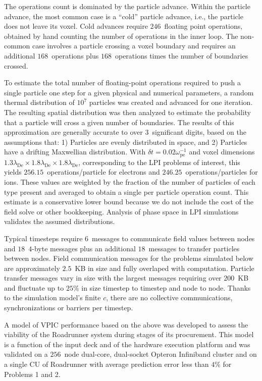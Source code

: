\documentclass[journal,twoside]{IEEEtran}
\newcommand{\lde}      {\lambda_{\mathrm{De}}}
\newcommand{\wpe}      {\omega_{\mathrm{pe}}}
\begin{document}
The operations count is dominated by the particle advance.  Within the
particle advance, the most common case is a ``cold'' particle advance,
i.e., the particle does not leave its voxel.  Cold advances require
$246$~floating point operations, obtained by hand counting the number
of operations in the inner loop.  The non-common case involves a
particle crossing a voxel boundary and requires an additional
$168$~operations plus $168$~operations times the number of boundaries
crossed.

To estimate the total number of floating-point operations required to
push a single particle one step for a given physical and numerical
parameters, a random thermal distribution of $10^7$ particles was
created and advanced for one iteration.  The resulting spatial
distribution was then analyzed to estimate the probability that a
particle will cross a given number of boundaries.  The results of this
approximation are generally accurate to over $3$~significant digits,
based on the assumptions that: 1) Particles are evenly distributed in
space, and 2) Particles have a drifting Maxwellian distribution.  With
$\delta t = 0.02 \wpe^{-1}$ and voxel dimensions $1.3\lde \times
1.8\lde \times 1.8\lde$, corresponding to the LPI problems of
interest, this yields $256.15$~operations/particle for electrons and
$246.25$~operations/particles for ions.  These values are weighted by
the fraction of the number of particles of each type present and
averaged to obtain a single per particle operation count.  This
estimate is a conservative lower bound because we do not include the
cost of the field solve or other bookkeeping.  Analysis of phase space
in LPI simulations validates the assumed
distributions.~\cite{Yin_et_al_Phys_Plasmas_2007_SRS}

Typical timesteps require $6$~messages to communicate field values
between nodes and $18$~$4$-byte messages plus an additional
$18$~messages to transfer particles between nodes.  Field
communication messages for the problems simulated below are
approximately $2.5$~KB in size and fully overlaped with computation.
Particle transfer messages vary in size with the largest messages
requiring over $200$~KB and fluctuate up to $25\%$ in size timestep to
timestep and node to node.  Thanks to the simulation model's finite
$c$, there are no collective communications, synchronizations or
barriers per timestep.

A model of VPIC performance based on the above was developed to assess
the viability of the Roadrunner system during stages of its
procurement.  This model is a function of the input deck and of the
hardware execution platform and was validated on a $256$~node
dual-core, dual-socket Opteron Infiniband cluster and on a single CU
of Roadrunner with average prediction error less than $4\%$ for
Problems 1 and 2.
\end{document}
